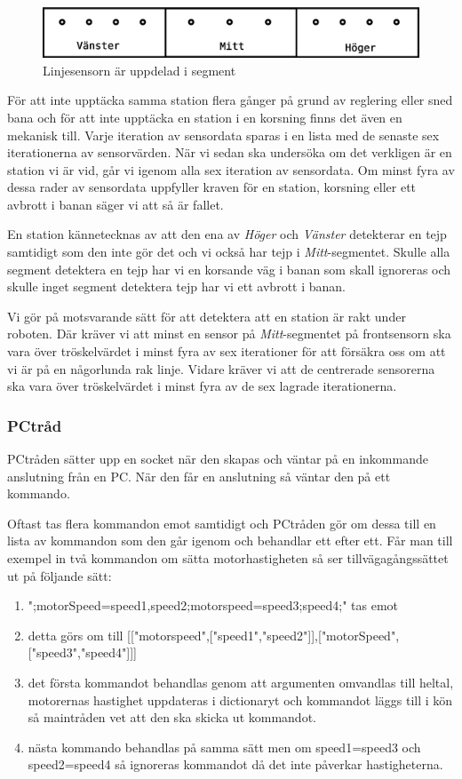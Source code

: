 \begin{figure}[h!]
	\centering
	\includegraphics[scale=0.4]{grafik/huvud-linjesensor}
	\caption{Linjesensorn är uppdelad i segment} \label{huvud-linjesensor}
\end{figure}

För att inte upptäcka samma station flera gånger på grund av reglering eller sned bana och för att inte upptäcka en station i en korsning finns det även en mekanisk till. Varje iteration av sensordata sparas i en lista med de senaste sex iterationerna av sensorvärden. När vi sedan ska undersöka om det verkligen är en station vi är vid, går vi igenom alla sex iteration av sensordata. Om minst fyra av dessa rader av sensordata uppfyller kraven för en station, korsning eller ett avbrott i banan säger vi att så är fallet.

En station kännetecknas av att den ena av \textit{Höger} och \textit{Vänster} detekterar en tejp samtidigt som den inte gör det och vi också har tejp i \textit{Mitt}-segmentet. Skulle alla segment detektera en tejp har vi en korsande väg i banan som skall ignoreras och skulle inget segment detektera tejp har vi ett avbrott i banan.

Vi gör på motsvarande sätt för att detektera att en station är rakt under roboten. Där kräver vi att minst en sensor på \textit{Mitt}-segmentet på frontsensorn ska vara över tröskelvärdet i minst fyra av sex iterationer för att försäkra oss om att vi är på en någorlunda rak linje. Vidare kräver vi att de centrerade sensorerna ska vara över tröskelvärdet i minst fyra av de sex lagrade iterationerna.

\subsubsection{PCtråd}
PCtråden sätter upp en socket när den skapas och väntar på en inkommande anslutning från en PC. När den får en anslutning så väntar den på ett kommando.

Oftast tas flera kommandon emot samtidigt och PCtråden gör om dessa till en lista av kommandon som den går igenom och behandlar ett efter ett. Får man till exempel in två kommandon om sätta motorhastigheten så ser tillvägagångssättet ut på följande sätt:
\begin{enumerate}
\item ";motorSpeed=speed1,speed2;motorspeed=speed3;speed4;" tas emot
\item detta görs om till [["motorspeed",["speed1","speed2"]],["motorSpeed",["speed3","speed4"]]]
\item det första kommandot behandlas genom att argumenten omvandlas till heltal, motorernas hastighet uppdateras i dictionaryt och kommandot läggs till i kön så maintråden vet att den ska skicka ut kommandot.
\item nästa kommando behandlas på samma sätt men om speed1=speed3 och speed2=speed4 så ignoreras kommandot då det inte påverkar hastigheterna.
\end{enumerate}

